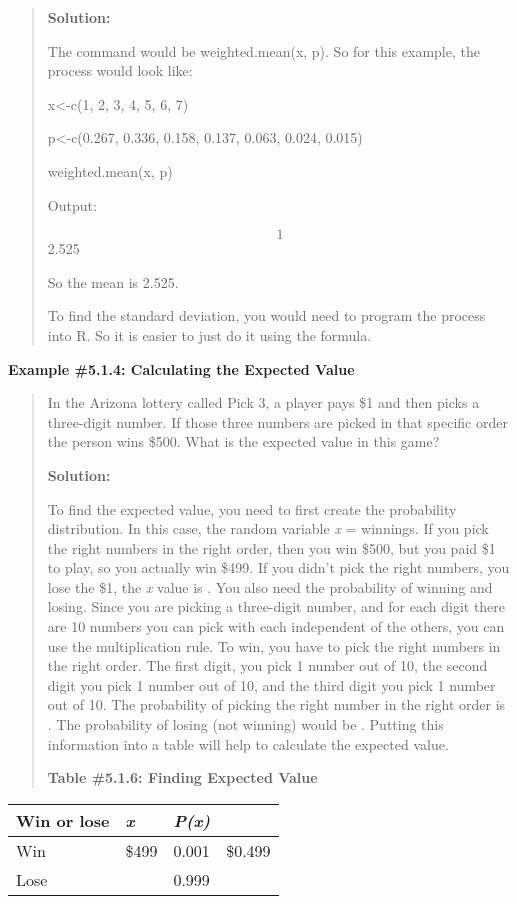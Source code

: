 \documentclass[]{book}
\begin{document}
\begin{quote}
\textbf{Solution:}

The command would be weighted.mean(x, p). So for this example, the
process would look like:

x\textless{}-c(1, 2, 3, 4, 5, 6, 7)

p\textless{}-c(0.267, 0.336, 0.158, 0.137, 0.063, 0.024, 0.015)

weighted.mean(x, p)

Output:

\[1\] 2.525

So the mean is 2.525.

To find the standard deviation, you would need to program the process
into R. So it is easier to just do it using the formula.
\end{quote}

\textbf{Example \#5.1.4: Calculating the Expected Value}

\begin{quote}
In the Arizona lottery called Pick 3, a player pays \$1 and then picks
a three-digit number. If those three numbers are picked in that
specific order the person wins \$500. What is the expected value in
this game?

\textbf{Solution:}

To find the expected value, you need to first create the probability
distribution. In this case, the random variable \emph{x} = winnings. If you
pick the right numbers in the right order, then you win \$500, but you
paid \$1 to play, so you actually win \$499. If you didn't pick the
right numbers, you lose the \$1, the \emph{x} value is . You also need the
probability of winning and losing. Since you are picking a three-digit
number, and for each digit there are 10 numbers you can pick with each
independent of the others, you can use the multiplication rule. To
win, you have to pick the right numbers in the right order. The first
digit, you pick 1 number out of 10, the second digit you pick 1 number
out of 10, and the third digit you pick 1 number out of 10. The
probability of picking the right number in the right order is . The
probability of losing (not winning) would be . Putting this
information into a table will help to calculate the expected value.

\textbf{Table \#5.1.6: Finding Expected Value}
\end{quote}

\begin{longtable}[]{@{}llll@{}}
\toprule
Win or lose & \emph{x} & \emph{P(x)} &\tabularnewline
\midrule
\endhead
Win & \$499 & 0.001 & \$0.499\tabularnewline
Lose & & 0.999 &\tabularnewline
\bottomrule
\end{longtable}
\end{document}
